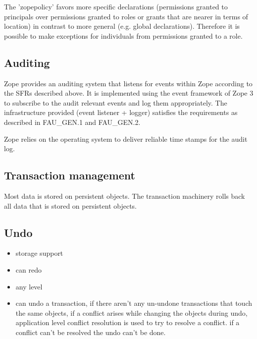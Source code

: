 \documentclass[12pt,english]{scrbook}
\begin{document}
The 'zopepolicy' favors more specific declarations (permissions granted to
principals over permissions granted to roles or grants that are nearer in terms
of location) in contrast to more general (e.g. global declarations). Therefore
it is possible to make exceptions for individuals from permissions granted to a
role.





\subsection{Auditing}

Zope provides an auditing system that listens for events within Zope according
to the SFRs described above. It is implemented using the event framework of
Zope 3 to subscribe to the audit relevant events and log them appropriately.
The infrastructure provided (event listener + logger) satisfies the
requirements as described in FAU{\_}GEN.1 and FAU{\_}GEN.2.

Zope relies on the operating system to deliver reliable time stamps for the
audit log.





\subsection{Transaction management}

Most data is stored on persistent objects. The transaction machinery rolls back
all data that is stored on persistent objects.





\subsection{Undo}
\begin{itemize}
\item {} 
storage support

\item {} 
can redo

\item {} 
any level

\item {} 
can undo a transaction, if there aren't any un-undone transactions that touch
the same objects, if a conflict arises while changing the objects during
undo, application level conflict resolution is used to try to resolve a
conflict. if a conflict can't be resolved the undo can't be done.

\end{itemize}
\end{document}
